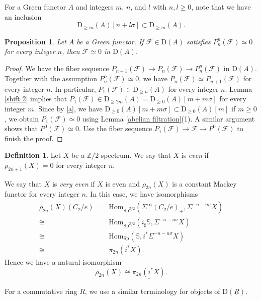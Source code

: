 \documentclass[10pt]{amsart}
\newtheorem{prop}[thm]{Proposition}
\theoremstyle{definition}
\newtheorem{df}[thm]{Definition}
\numberwithin{equation}{section}
\newcommand{\Sphere}{\mathbb{S}}
\newcommand{\Z}{\mathbb{Z}}
\newcommand{\cF}{\mathcal{F}}
\newcommand{\rD}{\mathrm{D}}
\newcommand{\ul}{\underline}
\newcommand{\Sp}{\mathrm{Sp}}
\newcommand{\Hom}{\mathrm{Hom}}
\begin{document}
For a Green functor $A$ and integers $m$, $n$, and $l$ with $n,l\geq 0$,
note that we have an inclusion
\begin{equation}
\label{a}
\rD_{\geq m}(A)[n+l\sigma]\subset \rD_{\geq m}(A).
\end{equation}

\begin{prop}
\label{conservative slices}
Let $A$ be a Green functor.
If $\cF\in \rD(A)$ satisfies $P_n^n(\cF)\simeq 0$ for every integer $n$,
then $\cF\simeq 0$ in $\rD(A)$.
\end{prop}
\begin{proof}
We have the fiber sequence $P_{n+1}(\cF)\to P_n(\cF)\to P_n^n(\cF)$ in $\rD(A)$.
Together with the assumption $P_n^n(\cF)\simeq 0$,
we have $P_n(\cF)\simeq P_{n+1}(\cF)$ for every integer $n$.
In particular, $P_1(\cF)\in \rD_{\geq n}(A)$ for every integer $n$.
Lemma \ref{shift 2} implies that
$P_1(\cF)\in \rD_{\geq 2m}(A)=\rD_{\geq 0}(A)[m+m\sigma]$ for every integer $m$.
Since by \eqref{a}, we have $\rD_{\geq 0}(A)[m+m\sigma]\subset  \rD_{\geq 0}(A)[m]$ if $m\geq 0$,
we obtain $P_1(\cF)\simeq 0$ using Lemma \ref{abelian filtration}(1).
A similar argument shows that $P^0(\cF)\simeq 0$.
Use the fiber sequence $P_1(\cF)\to \cF\to P^0(\cF)$ to finish the proof.
\end{proof}


\begin{df}\label{def:even}
Let $X$ be a $\Z/2$-spectrum.
We say that $X$ is \emph{even} if $\rho_{2n+1}(X)=0$ for every integer $n$.


We say that $X$ is \emph{very even} if $X$ is even and $\rho_{2n}(X)$ is a constant Mackey functor for every integer $n$.
In this case,
we have isomorphisms
\begin{align*}
\rho_{2n}(X)(C_2/e)
= &
\Hom_{\Sp^{\Z/2}}(\Sigma^\infty (C_2/e)_+,\Sigma^{-n-n\sigma}X)
\\
\cong &
\Hom_{\Sp^{\Z/2}}(i_\sharp \Sphere,\Sigma^{-n-n\sigma}X)
\\
\cong &
\Hom_{\Sp}(\Sphere,i^*\Sigma^{-n-n\sigma}X)
\\
\cong &
\pi_{2n}(i^*X).
\end{align*}
Hence we have a natural isomorphism
\begin{equation}
\label{eq:very even}
\rho_{2n}(X)\cong \ul{\pi_{2n}(i^* X)}.
\end{equation}


For a commutative ring $R$,
we use a similar terminology for objects of $\rD(\ul{R})$.
\end{df}
\end{document}
